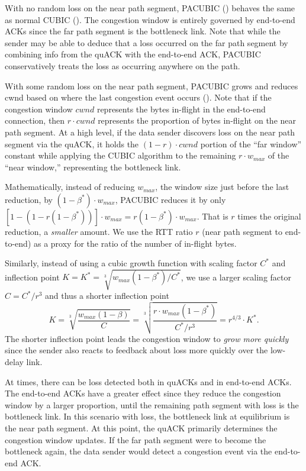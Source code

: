 With no random loss on the near path segment, PACUBIC
() behaves the same as normal CUBIC
(). The congestion window is entirely governed
by end-to-end ACKs since the far path segment is the bottleneck link. Note that
while the sender may be able to deduce that a loss occurred on the far path
segment by combining info from the quACK with the end-to-end ACK, PACUBIC
conservatively treats the loss as occurring anywhere on the path.

With some random loss on the near path segment, PACUBIC grows and reduces cwnd
based on where the last congestion event occurs
(). Note that if the congestion window $cwnd$
represents the bytes in-flight in the end-to-end connection, then $r \cdot cwnd$
represents the proportion of bytes in-flight on the near path segment. At a
high level, if the data sender discovers loss on the near path segment via the
quACK, it holds the $(1-r)\cdot cwnd$ portion of the ``far window'' constant
while applying the CUBIC algorithm to the remaining $r \cdot w_{max}$ of the
``near window,'' representing the bottleneck link.

Mathematically, instead of reducing $w_{max}$, the window size just before the
last reduction, by $(1-\beta^*) \cdot w_{max}$, PACUBIC reduces it by only
$[1 - (1-r(1-\beta^*))] \cdot w_{max} = r(1-\beta^*) \cdot w_{max}$.
That is $r$ times the original reduction, a \emph{smaller} amount.
We use the RTT ratio $r$ (near path segment to end-to-end)
as a proxy for the ratio of the number of in-flight bytes.

Similarly, instead of using a cubic growth function with scaling factor $C^*$
and inflection point $K = K^* = \sqrt[3]{w_{max}(1-\beta^*)/C^*}$,
we use a larger scaling factor $C = C^*/r^3$
and thus a shorter inflection point
\[
K = \sqrt[3]{\frac{w_{max}(1-\beta)}{C}}
= \sqrt[3]{\frac{r\cdot w_{max}(1-\beta^*)}{C^* / r^3}}
= r^{4/3} \cdot K^*.
\]
The shorter inflection point leads the congestion window to \emph{grow more
quickly} since the sender also reacts to feedback about loss more quickly over
the low-delay link.

At times, there can be loss detected both in quACKs and in end-to-end ACKs.
The end-to-end ACKs have a greater effect since they reduce the congestion
window by a larger proportion, until the remaining path segment with loss is the
bottleneck link. In this scenario with loss, the bottleneck link at equilibrium
is the near path segment.
At this point, the quACK primarily determines the congestion window updates. If
the far path segment were to become the bottleneck again, the data sender would
detect a congestion event via the end-to-end ACK.

